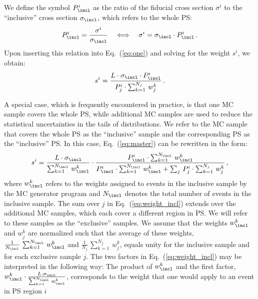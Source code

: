 We define the symbol $P_{\incl}^{i}$ as the ratio of the fiducial cross section $\sigma^{i}$ to the ``inclusive'' cross section $\sigma_{\incl}$,
which refers to the whole PS:
\begin{equation*}
P_{\incl}^{i} = \frac{\sigma^{i}}{\sigma_{\incl}} \quad \Longleftrightarrow \quad \sigma^{i} = \sigma_{\incl} \cdot P_{\incl}^{i} \, .
\label{eq:two}
\end{equation*}
Upon inserting this relation into Eq.~(\ref{eq:one}) and solving for the weight $s^{i}$, we obtain:
\begin{equation}
s^{i} = \frac{L \cdot \sigma_{\incl} \cdot P_{\incl}^{i}}{P_{j}^{i} \cdot \sum_{k=1}^{N_{j}} \, w_{j}^{k}} \, .
\label{eq:master}
\end{equation}

A special case, which is frequently encountered in practice,
is that one MC sample covers the whole PS,
while additional MC samples are used to reduce the statistical uncertainties in the tails of distributions.
We refer to the MC sample that covers the whole PS as the ``inclusive'' sample and the corresponding PS as the ``inclusive'' PS.
In this case, Eq.~(\ref{eq:master}) can be rewritten in the form:
\begin{equation}
s^{i} = \frac{L \cdot \sigma_{\incl}}{\sum_{k=1}^{N_{\incl}} \, w_{\incl}^{k}} \cdot \frac{P_{\incl}^{i} \cdot \sum_{k=1}^{N_{\incl}} \, w_{\incl}^{k}}{P_{\incl}^{i} \cdot \sum_{k=1}^{N_{\incl}} \, w_{\incl}^{k} + \sum_{j} \, P_{j}^{i} \cdot \sum_{k=1}^{N_{j}} \, w_{j}^{k}} \, ,
\label{eq:weight_incl}
\end{equation}
where $w_{\incl}^{k}$ refers to the weights assigned to events in the inclusive sample by the MC generator program and $N_{\incl}$ denotes the total number of events in the inclusive sample.
The sum over $j$ in Eq.~(\ref{eq:weight_incl}) extends over the additional MC samples, which each cover a different region in PS.
We will refer to these samples as the ``exclusive'' samples.
We assume that the weights $w_{\incl}^{k}$ and $w_{j}^{k}$ are normalized such that the average of these weights,
$\frac{1}{N_{\incl}} \, \sum_{k=1}^{N_{\incl}} \, w_{\incl}^{k}$ and $\frac{1}{N_{j}} \, \sum_{k=1}^{N_{j}} \, w_{j}^{k}$,
equals unity for the inclusive sample and for each exclusive sample $j$.
The two factors in Eq.~(\ref{eq:weight_incl}) may be interpreted in the following way:
The product of $w_{\incl}^{k}$ and the first factor, $w_{\incl}^{k} \cdot \frac{L \cdot \sigma_{\incl}}{\sum_{k=1}^{N_{\incl}} \, w_{\incl}^{k}}$,
corresponds to the weight that one would apply to an event in PS region $i$ 
